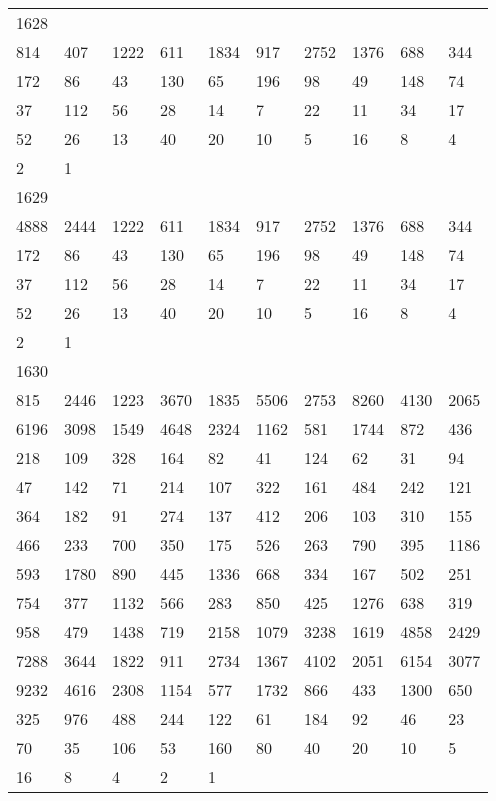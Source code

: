 \begin{longtable}{*{10}{l}}
1628&&&&&&&&&\\
814& 407& 1222& 611& 1834& 917& 2752& 1376& 688& 344\\
172& 86& 43& 130& 65& 196& 98& 49& 148& 74\\
37& 112& 56& 28& 14& 7& 22& 11& 34& 17\\
52& 26& 13& 40& 20& 10& 5& 16& 8& 4\\
2& 1& \\

1629&&&&&&&&&\\
4888& 2444& 1222& 611& 1834& 917& 2752& 1376& 688& 344\\
172& 86& 43& 130& 65& 196& 98& 49& 148& 74\\
37& 112& 56& 28& 14& 7& 22& 11& 34& 17\\
52& 26& 13& 40& 20& 10& 5& 16& 8& 4\\
2& 1& \\

1630&&&&&&&&&\\
815& 2446& 1223& 3670& 1835& 5506& 2753& 8260& 4130& 2065\\
6196& 3098& 1549& 4648& 2324& 1162& 581& 1744& 872& 436\\
218& 109& 328& 164& 82& 41& 124& 62& 31& 94\\
47& 142& 71& 214& 107& 322& 161& 484& 242& 121\\
364& 182& 91& 274& 137& 412& 206& 103& 310& 155\\
466& 233& 700& 350& 175& 526& 263& 790& 395& 1186\\
593& 1780& 890& 445& 1336& 668& 334& 167& 502& 251\\
754& 377& 1132& 566& 283& 850& 425& 1276& 638& 319\\
958& 479& 1438& 719& 2158& 1079& 3238& 1619& 4858& 2429\\
7288& 3644& 1822& 911& 2734& 1367& 4102& 2051& 6154& 3077\\
9232& 4616& 2308& 1154& 577& 1732& 866& 433& 1300& 650\\
325& 976& 488& 244& 122& 61& 184& 92& 46& 23\\
70& 35& 106& 53& 160& 80& 40& 20& 10& 5\\
16& 8& 4& 2& 1& \\


\end{longtable}
